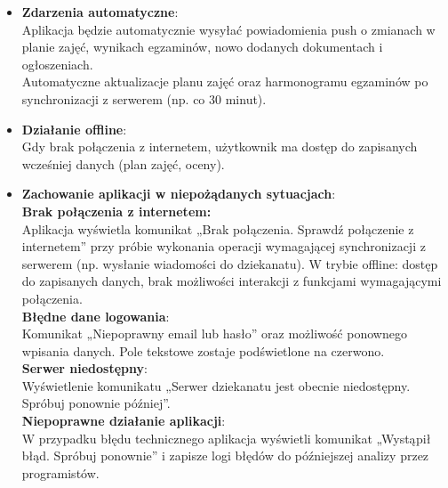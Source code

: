 \begin{itemize}
      \item \textbf{Zdarzenia automatyczne}:
            \\Aplikacja będzie automatycznie wysyłać powiadomienia push o zmianach w planie zajęć, wynikach egzaminów, nowo dodanych dokumentach i ogłoszeniach.
            \\Automatyczne aktualizacje planu zajęć oraz harmonogramu egzaminów po synchronizacji z serwerem (np. co 30 minut).
      \item \textbf{Działanie offline}:
            \\Gdy brak połączenia z internetem, użytkownik ma dostęp do zapisanych wcześniej danych (plan zajęć, oceny).
      \item \textbf{Zachowanie aplikacji w niepożądanych sytuacjach}:
            \\\textbf{Brak połączenia z internetem:}
            \\Aplikacja wyświetla komunikat „Brak połączenia. Sprawdź połączenie z internetem” przy próbie wykonania operacji wymagającej synchronizacji z serwerem (np. wysłanie wiadomości do dziekanatu).
            W trybie offline: dostęp do zapisanych danych, brak możliwości interakcji z funkcjami wymagającymi połączenia.
            \\\textbf{Błędne dane logowania}:
            \\Komunikat „Niepoprawny email lub hasło” oraz możliwość ponownego wpisania danych. Pole tekstowe zostaje podświetlone na czerwono.
            \\\textbf{Serwer niedostępny}:
            \\Wyświetlenie komunikatu „Serwer dziekanatu jest obecnie niedostępny. Spróbuj ponownie później”.
            \\\textbf{Niepoprawne działanie aplikacji}:
            \\W przypadku błędu technicznego aplikacja wyświetli komunikat „Wystąpił błąd. Spróbuj ponownie” i zapisze logi błędów do późniejszej analizy przez programistów.
\end{itemize}
